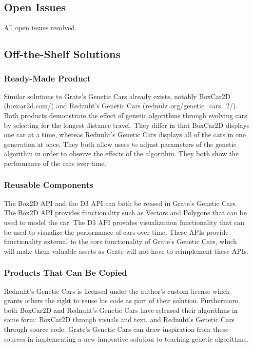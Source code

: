 \documentclass[12pt, titlepage]{article}
\begin{document}
\subsection{Open Issues}
All open issues resolved.

\subsection{Off-the-Shelf Solutions}

\subsubsection{Ready-Made Product}
Similar solutions to Grate's Genetic Cars already exists, notably BoxCar2D 
(boxcar2d.com/) and Rednuht's Genetic Cars (rednuht.org/genetic\_cars\_2/). Both 
products demonstrate the effect of genetic algorithms through evolving cars by 
selecting for the longest distance travel. They differ in that BoxCar2D displays 
one car at a time, whereas Rednuht's Genetic Cars displays all of the cars in 
one generation at once. They both allow users to adjust parameters of the 
genetic algorithm in order to observe the effects of the algorithm. They both 
show the performance of the cars over time.

\subsubsection{Reusable Components}
The Box2D API and the D3 API can both be reused in Grate's Genetic Cars. The 
Box2D API provides functionality such as Vectors and Polygons that can be used 
to model the car. The D3 API provides visualization functionality that can be 
used to visualize the performance of cars over time. These APIs provide 
functionality external to the core functionality of Grate's Genetic Cars, which 
will make them valuable assets as Grate will not have to reimplement these APIs.

\subsubsection{Products That Can Be Copied}
Rednuht's Genetic Cars is licensed under the author's custom license which 
grants others the right to reuse his code as part of their solution. 
Furthermore, both BoxCar2D and Rednuht's Genetic Cars have released their 
algorithms in some form: BoxCar2D through visuals and text, and Rednuht's 
Genetic Cars through source code. Grate's Genetic Cars can draw inspiration from 
these sources in implementing a new innovative solution to teaching genetic 
algorithms.
\end{document}
